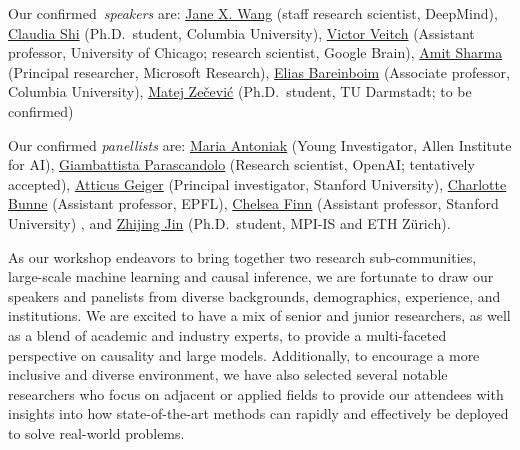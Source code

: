 \documentclass{article}
\begin{document}


Our confirmed~\textit{speakers} are:%
\href{https://www.janexwang.com/}{Jane X. Wang} (staff research scientist, DeepMind),
\href{https://www.claudiajshi.com/}{Claudia Shi} (Ph.D.\ student, Columbia University),
\href{http://victorveitch.com/}{Victor Veitch} (Assistant professor, University of Chicago; research scientist, Google Brain),
\href{https://amitsharma.in/}{Amit Sharma} (Principal researcher, Microsoft Research),
\href{https://causalai.net/}{Elias Bareinboim} (Associate professor, Columbia University), 
\href{https://www.matej-zecevic.de/}{Matej Zečević} (Ph.D.\ student, TU Darmstadt; to be confirmed)

Our confirmed \textit{panellists} are:
\href{https://maria-antoniak.github.io/}{Maria Antoniak} (Young Investigator, Allen Institute for AI),
\href{https://sites.google.com/view/giambattista-parascandolo/home}{Giambattista Parascandolo} (Research scientist, OpenAI; tentatively accepted),
\href{https://atticusg.github.io/}{Atticus Geiger} (Principal investigator, Stanford University),
\href{https://www.bunnelab.com/}{Charlotte Bunne} (Assistant professor, EPFL),
\href{https://ai.stanford.edu/~cbfinn/}{Chelsea Finn} (Assistant professor, Stanford University) , and
\href{https://zhijing-jin.com/}{Zhijing Jin} (Ph.D.\ student, MPI-IS and ETH Zürich).


As our workshop endeavors to bring together two research sub-communities, large-scale machine learning and causal inference, we are fortunate to draw our speakers and panelists from diverse backgrounds, demographics, experience, and institutions.
We are excited to have a mix of senior and junior researchers, as well as a blend of academic and industry experts, to provide a multi-faceted perspective on causality and large models.
Additionally, to encourage a more inclusive and diverse environment, we have also selected several notable researchers who focus on adjacent or applied fields to provide our attendees with insights into how state-of-the-art methods can rapidly and effectively be deployed to solve real-world problems.
\end{document}
